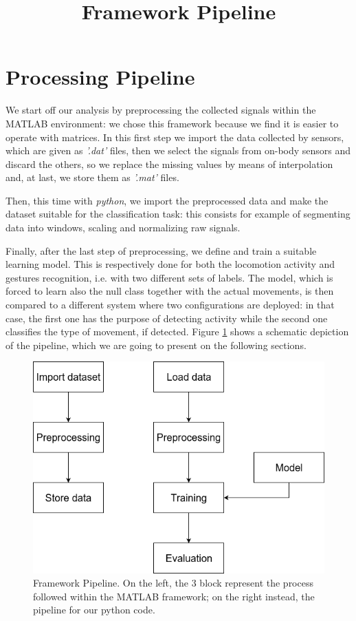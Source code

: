 
\section{Processing Pipeline}
\label{sec:processing_architecture}

We start off our analysis by preprocessing the collected signals within the MATLAB environment: we chose this framework because we find it is easier to operate with matrices. In this first step we import the data collected by sensors, which are given as \textit{'.dat'} files, then we select the signals from on-body sensors and discard the others, so we replace the missing values by means of interpolation and, at last, we store them as \textit{'.mat'} files.

Then, this time with \textit{python}, we import the preprocessed data and make the dataset suitable for the classification task: this consists for example of segmenting data into windows, scaling and normalizing raw signals.

Finally, after the last step of preprocessing, we define and train a suitable learning model. This is respectively done for both the locomotion activity and gestures recognition, i.e. with two different sets of labels. The model, which is forced to learn also the null class together with the actual movements, is then compared to a different system where two configurations are deployed: in that case, the first one has the purpose of detecting activity while the second one classifies the type of movement, if detected. Figure \ref{fig:pipeline} shows a schematic depiction of the pipeline, which we are going to present on the following sections.

\begin{figure}[ht]
	\centering
	\includegraphics[scale=.4]{figure/block_diag}
	\title{Framework Pipeline}
	\caption{Framework Pipeline. On the left, the 3 block represent the process followed within the MATLAB framework; on the right instead, the pipeline for our python code.}
	\label{fig:pipeline}
\end{figure}

